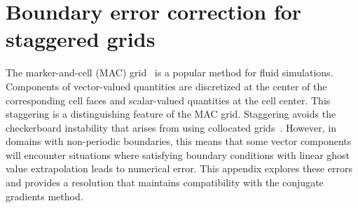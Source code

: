 \section{Boundary error correction for staggered grids}\label{sec:boundary-correction}

The marker-and-cell (MAC) grid~\cite{Welch:1965jv} is a popular method for fluid simulations. Components of
vector-valued quantities are discretized at the center of the corresponding cell faces and scalar-valued
quantities at the cell center. This staggering is a distinguishing feature of the MAC grid. Staggering avoids the
checkerboard instability that arises from using collocated grids~\cite{Wesseling:2001ci}. However, in domains
with non-periodic boundaries, this means that some vector components will encounter situations where satisfying
boundary conditions with linear ghost value extrapolation leads to numerical error. This appendix explores these
errors and provides a resolution that maintains compatibility with the conjugate gradients method.

